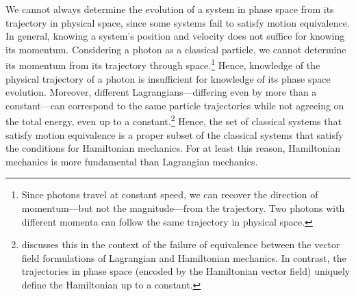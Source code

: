\documentclass[12pt, english, twoside]{article} %
\begin{document}
We cannot always determine the evolution of a system in phase space from its trajectory in physical space, since some systems fail to satisfy motion equivalence. In general, knowing a system's position and velocity does not suffice for knowing its momentum. Considering a photon as a classical particle, we cannot determine its momentum from its trajectory through space.\footnote{Since photons travel at constant speed, we can recover the direction of momentum---but not the magnitude---from the trajectory. Two photons with different momenta can follow the same trajectory in physical space.} Hence, knowledge of the physical trajectory of a photon is insufficient for knowledge of its phase space evolution. Moreover, different Lagrangians---differing even by more than a constant---can correspond to the same particle trajectories while not agreeing on the total energy, even up to a constant.\footnote{\textcites[1185--1186]{Barrett2} discusses this in the context of the failure of equivalence between the vector field formulations of Lagrangian and Hamiltonian mechanics. In contrast, the trajectories in phase space (encoded by the Hamiltonian vector field) uniquely define the Hamiltonian up to a constant.} Hence, the set of classical systems that satisfy motion equivalence is a proper subset of the classical systems that satisfy the conditions for Hamiltonian mechanics. For at least this reason, Hamiltonian mechanics is more fundamental than Lagrangian mechanics.
\end{document}
